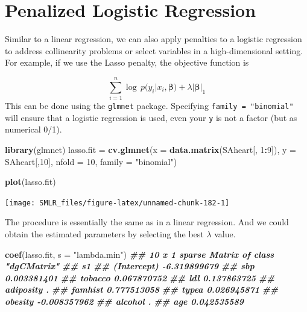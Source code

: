 \documentclass[
]{book}
\newenvironment{Shaded}{\begin{snugshade}}{\end{snugshade}}
\newcommand{\AttributeTok}[1]{\textcolor[rgb]{0.13,0.29,0.53}{#1}}
\newcommand{\DecValTok}[1]{\textcolor[rgb]{0.00,0.00,0.81}{#1}}
\newcommand{\DocumentationTok}[1]{\textcolor[rgb]{0.56,0.35,0.01}{\textbf{\textit{#1}}}}
\newcommand{\FunctionTok}[1]{\textcolor[rgb]{0.13,0.29,0.53}{\textbf{#1}}}
\newcommand{\NormalTok}[1]{#1}
\newcommand{\OtherTok}[1]{\textcolor[rgb]{0.56,0.35,0.01}{#1}}
\newcommand{\SpecialCharTok}[1]{\textcolor[rgb]{0.81,0.36,0.00}{\textbf{#1}}}
\newcommand{\StringTok}[1]{\textcolor[rgb]{0.31,0.60,0.02}{#1}}
\theoremstyle{definition}
\theoremstyle{definition}
\theoremstyle{definition}
\theoremstyle{definition}
\theoremstyle{remark}
\begin{document}
\hypertarget{penalized-logistic-regression}{%
\section{Penalized Logistic Regression}\label{penalized-logistic-regression}}

Similar to a linear regression, we can also apply penalties to a logistic regression to address collinearity problems or select variables in a high-dimensional setting. For example, if we use the Lasso penalty, the objective function is

\[\sum_{i=1}^n \log \, p(y_i | x_i, \boldsymbol \beta) + \lambda |\boldsymbol \beta|_1\]
This can be done using the \texttt{glmnet} package. Specifying \texttt{family\ =\ "binomial"} will ensure that a logistic regression is used, even your \texttt{y} is not a factor (but as numerical 0/1).

\begin{Shaded}
\begin{Highlighting}[]
  \FunctionTok{library}\NormalTok{(glmnet)}
\NormalTok{  lasso.fit }\OtherTok{=} \FunctionTok{cv.glmnet}\NormalTok{(}\AttributeTok{x =} \FunctionTok{data.matrix}\NormalTok{(SAheart[, }\DecValTok{1}\SpecialCharTok{:}\DecValTok{9}\NormalTok{]), }\AttributeTok{y =}\NormalTok{ SAheart[,}\DecValTok{10}\NormalTok{], }
                        \AttributeTok{nfold =} \DecValTok{10}\NormalTok{, }\AttributeTok{family =} \StringTok{"binomial"}\NormalTok{)}
  
  \FunctionTok{plot}\NormalTok{(lasso.fit)}
\end{Highlighting}
\end{Shaded}

\begin{center}\texttt{[image: SMLR\_files/figure-latex/unnamed-chunk-182-1]} \end{center}

The procedure is essentially the same as in a linear regression. And we could obtain the estimated parameters by selecting the best \(\lambda\) value.

\begin{Shaded}
\begin{Highlighting}[]
  \FunctionTok{coef}\NormalTok{(lasso.fit, }\AttributeTok{s =} \StringTok{"lambda.min"}\NormalTok{)}
\DocumentationTok{\#\# 10 x 1 sparse Matrix of class "dgCMatrix"}
\DocumentationTok{\#\#                       s1}
\DocumentationTok{\#\# (Intercept) {-}6.319899679}
\DocumentationTok{\#\# sbp          0.003381401}
\DocumentationTok{\#\# tobacco      0.067870752}
\DocumentationTok{\#\# ldl          0.137863725}
\DocumentationTok{\#\# adiposity    .          }
\DocumentationTok{\#\# famhist      0.777513058}
\DocumentationTok{\#\# typea        0.026945871}
\DocumentationTok{\#\# obesity     {-}0.008357962}
\DocumentationTok{\#\# alcohol      .          }
\DocumentationTok{\#\# age          0.042535589}
\end{Highlighting}
\end{Shaded}
\end{document}
